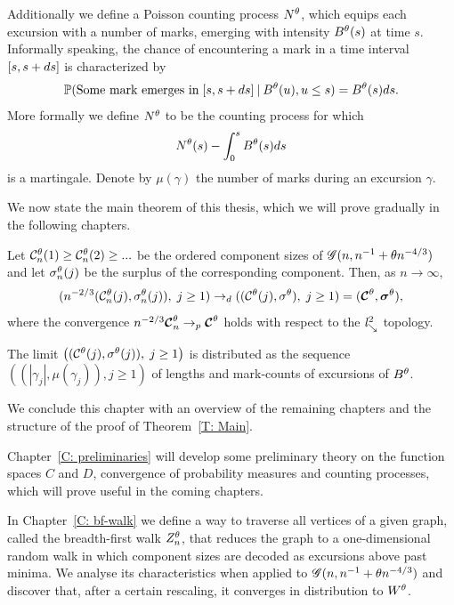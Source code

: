Additionally we define a Poisson counting process $N^{\theta}$, 
which equips each excursion with a number of marks,
emerging with intensity $B^{\theta}(s)$ at time $s$.
Informally speaking, the chance of encountering a mark in a time interval $[s, s+ds]$ is characterized by
\begin{equation}
	\mathbb{P}( \text{Some mark emerges in} \; [s, s+ds] \: | \: B^{\theta}(u), u \leq s ) = B^{\theta}(s)ds.
\end{equation}
More formally we define $N^{\theta}$ to be the counting process for which
\begin{equation}
	N^{\theta}(s) - \int_{0}^{s} B^{\theta}(s)ds
\end{equation}
is a martingale.
Denote by $\mu(\gamma)$ the number of marks during an excursion $\gamma$.

We now state the main theorem of this thesis, which we will prove gradually in the following chapters.
\begin{theorem} \label{T: Main}
	Let 
	$\mathcal{C}^{\theta}_n(1) \geq \mathcal{C}^{\theta}_n(2) \geq ... $ 
	be the ordered component sizes of 
	$\mathscr{G}(n, n^{-1} + \theta n^{-4/3})$
	and let
	$\mathcal{\sigma}^{\theta}_n(j)$ 
	be the surplus of the corresponding component.
	Then, as $n \rightarrow \infty$,
	\begin{equation}
	( n^{-2 / 3} ( \mathcal{C}^{\theta}_n(j), \mathcal{\sigma}^{\theta}_n(j) ), \; j \geq 1 ) 
	\rightarrow_d
	( (\mathcal{C}^{\theta}(j), \mathcal{\sigma}^{\theta}), \; j \geq 1 )
	= ( \boldsymbol{\mathcal{C}}^{\theta}, \boldsymbol{\mathcal{\sigma}}^{\theta} ),
	\end{equation}
	where the convergence 
	$n^{-2 / 3} \boldsymbol{\mathcal{C}}^{\theta}_n \rightarrow_p \boldsymbol{\mathcal{C}}^{\theta}$
	holds with respect to the $\mathit{l}^2_{\searrow}$ topology.
	
	The limit
	$\left( ( \mathcal{C}^{\theta}(j), \mathcal{\sigma}^{\theta}(j) ), \; j \geq 1 \right)$
	is distributed as the sequence
	$ \left( (|\gamma_j|, \mu(\gamma_j)), j \geq 1  \right) $
	of lengths and mark-counts of excursions of $B^{\theta}$.
\end{theorem}

We conclude this chapter with an overview of the remaining chapters and the structure of the proof of Theorem~\ref{T: Main}.

Chapter~\ref{C: preliminaries} will develop some preliminary theory on the function spaces $C$ and $D$,
convergence of probability measures and counting processes, which will prove useful in the coming chapters.

In Chapter~\ref{C: bf-walk} we define a way to traverse all vertices of a given graph, called the breadth-first walk $Z_n^{\theta}$, 
that reduces the graph to a one-dimensional random walk in which component sizes are decoded as excursions above past minima.
We analyse its characteristics when applied to $\mathscr{G}(n, n^{-1} + \theta n^{-4/3})$ and discover that, after a certain rescaling, it converges in distribution to $W^{\theta}$.

